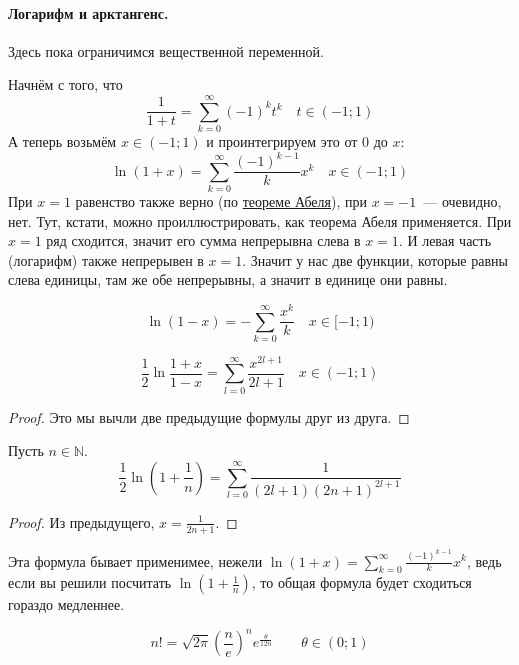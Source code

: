\documentclass{article}
\begin{document}
    \paragraph{Логарифм и арктангенс.}
    \begin{remark}
        Здесь пока ограничимся вещественной переменной.
    \end{remark}
    \begin{claim}
        Начнём с того, что
        $$
        \frac1{1+t}=\sum\limits_{k=0}^\infty(-1)^kt^k\quad t\in(-1;1)
        $$
        А теперь возьмём $x\in(-1;1)$ и проинтегрируем это от 0 до $x$:
        $$
        \ln(1+x)=\sum\limits_{k=0}^\infty\frac{(-1)^{k-1}}kx^k\quad x\in(-1;1)
        $$
        При $x=1$ равенство также верно (по \hyperref[Теорема Абеля о степенных рядах]{теореме Абеля}), при $x=-1$~--- очевидно, нет. Тут, кстати, можно проиллюстрировать, как теорема Абеля применяется. При $x=1$ ряд сходится, значит его сумма непрерывна слева в $x=1$. И левая часть (логарифм) также непрерывен в $x=1$. Значит у нас две функции, которые равны слева единицы, там же обе непрерывны, а значит в единице они равны.
    \end{claim}
    \begin{claim}
        $$
        \ln(1-x)=-\sum\limits_{k=0}^\infty\frac{x^k}k\quad x\in[-1;1)
        $$
    \end{claim}
    \begin{claim}
        $$
        \frac12\ln\frac{1+x}{1-x}=\sum\limits_{l=0}^\infty\frac{x^{2l+1}}{2l+1}\quad x\in(-1;1)
        $$
    \end{claim}
    \begin{proof}
        Это мы вычли две предыдущие формулы друг из друга.
    \end{proof}
    \begin{claim}
        Пусть $n\in\mathbb N$.
        $$
        \frac12\ln\left(1+\frac1n\right)=\sum\limits_{l=0}^\infty\frac1{(2l+1)(2n+1)^{2l+1}}
        $$
    \end{claim}
    \begin{proof}
        Из предыдущего, $x=\frac1{2n+1}$.
    \end{proof}
    \begin{remark}
        Эта формула бывает применимее, нежели $\ln(1+x)=\sum\limits_{k=0}^\infty\frac{(-1)^{k-1}}kx^k$, ведь если вы решили посчитать $\ln\left(1+\frac1n\right)$, то общая формула будет сходиться гораздо медленнее.
    \end{remark}
    \begin{claim}
        $$
        n!=\sqrt{2\pi}\left(\frac ne\right)^ne^{\frac\theta{12n}}\qquad \theta\in(0;1)
        $$
    \end{claim}
\end{document}
